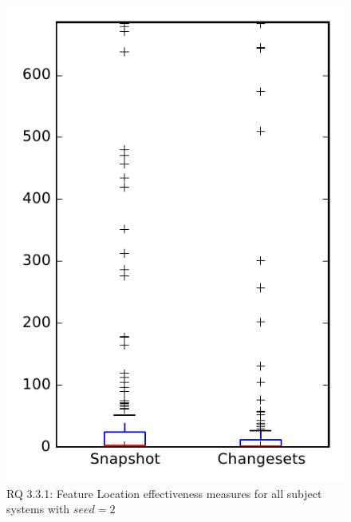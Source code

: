 
\begin{figure}
\centering
\includegraphics[height=0.4\textheight]{figures/flt_seed/rq1_overview_2}
\caption{RQ 3.3.1: Feature Location effectiveness measures for all subject systems with $seed=2$}
\label{fig:flt_seed:rq1:overview}
\end{figure}

